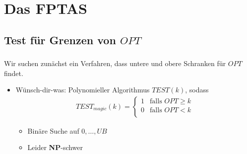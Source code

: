 \documentclass{beamer}
\begin{document}
\section{Das FPTAS}

\subsection{Test für Grenzen von $OPT$}

\begin{frame}
   \frametitle{\insertsection}
   \framesubtitle{\insertsubsection}

   Wir suchen zunächst ein Verfahren, dass untere und obere Schranken für $OPT$
   findet.
   \begin{itemize}
      \item Wünsch-dir-was: Polynomieller Algorithmus $TEST(k)$, sodass
         \begin{align*}
            TEST_{magic}(k) = 
            \begin{cases}
               1 & \text{falls } OPT \ge k \\
               0 & \text{falls } OPT < k \\
            \end{cases} 
         \end{align*}
         \begin{itemize}
            \item Binäre Suche auf ${0,\ldots,UB}$ 
            \item Leider \textbf{NP}-schwer
         \end{itemize}
   \end{itemize}
\end{frame}
\end{document}

